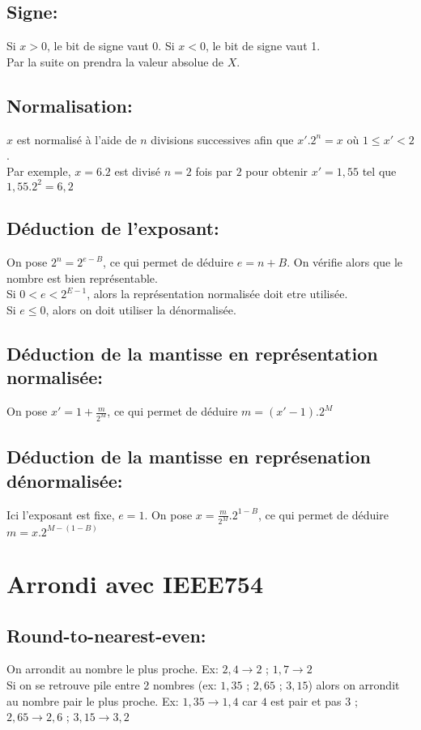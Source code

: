 \documentclass[11pt]{article}
\begin{document}
\subsection{Signe:}
Si $x > 0$, le bit de signe vaut 0. Si $x < 0$, le bit de signe vaut 1. \\
Par la suite on prendra la valeur absolue de $X$.

\subsection{Normalisation:}
$x$ est normalisé à l’aide de $n$ divisions successives afin que $x'.2^n=x$ où $1 \leq x' <2$. \\
Par exemple, $x=6.2$ est divisé $n=2$ fois par $2$ pour obtenir $x'=1,55$ tel que $1,55.2^2=6,2$

\subsection{Déduction de l'exposant:}
On pose $2^n=2^{e-B}$, ce qui permet de déduire $e=n+B$. On vérifie alors que le nombre est bien représentable. \\
Si $0<e<2^{E-1}$, alors la représentation normalisée doit etre utilisée. \\
Si $e \leq 0$, alors on doit utiliser la dénormalisée.

\subsection{Déduction de la mantisse en représentation normalisée:}
On pose $x'=1+\frac{m}{2^M}$, ce qui permet de déduire $m=(x'-1).2^M$

\subsection{Déduction de la mantisse en représenation dénormalisée:}
Ici l'exposant est fixe, $e=1$. On pose $x=\frac{m}{2^M}.2^{1-B}$, ce qui permet de déduire $m=x.2^{M-(1-B)}$

\newpage

\section{Arrondi avec IEEE754}

\subsection{Round-to-nearest-even:}
On arrondit au nombre le plus proche. Ex: $2,4 \rightarrow 2$ ; $1,7 \rightarrow 2$ \\
Si on se retrouve pile entre 2 nombres (ex: $1,35$ ; $2,65$ ; $3,15$) alors on arrondit au nombre pair le plus proche. Ex: $1,35 \rightarrow 1,4$ car $4$ est pair et pas $3$ ; 
$2,65 \rightarrow 2,6$ ; $3,15 \rightarrow 3,2$
\end{document}

